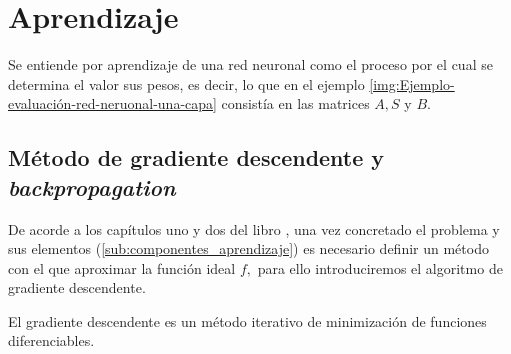 \section{Aprendizaje}  

Se entiende por aprendizaje de una red neuronal como el proceso 
por el cual se determina el valor sus pesos, es decir, lo que en el ejemplo \ref{img:Ejemplo-evaluación-red-neruonal-una-capa} consistía en las matrices $A,S$ y $B$.


\subsection{Método de gradiente descendente y \textit{backpropagation}} \label{sec:gradiente-descendente}

De acorde a los capítulos uno y dos del libro  \cite{learning-from-data-1-2},
 una vez concretado el problema y sus elementos 
(\ref{sub:componentes_aprendizaje}) es necesario definir un método con 
el que aproximar la función ideal $f,$ para ello introduciremos el algoritmo de gradiente descendente.  

El gradiente descendente es un método iterativo de minimización de funciones diferenciables. 

\reversemarginpar
{} 

\normalmarginpar
\setlength{\marginparwidth}{\smallMarginSize}


